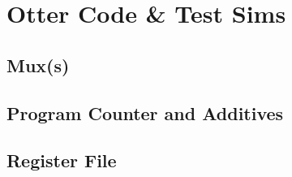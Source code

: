 \documentclass[a4paper]{report}
\begin{document}
	\newpage
	\section{Otter Code \& Test Sims}

		\subsection{Mux(s)}

			

			
	
			
	
			
	
		\newpage
		\subsection{Program Counter and Additives}

			
		
			

			


		\newpage
		\subsection{Register File}
\end{document}
